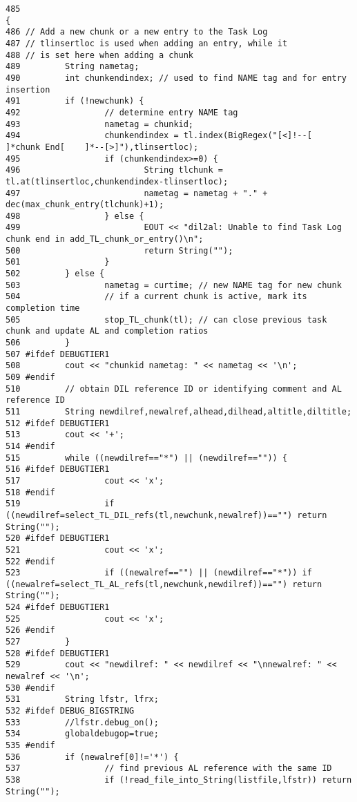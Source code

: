 \footnotesize\begin{verbatim}485                                                                                                                {
486 // Add a new chunk or a new entry to the Task Log
487 // tlinsertloc is used when adding an entry, while it
488 // is set here when adding a chunk
489         String nametag;
490         int chunkendindex; // used to find NAME tag and for entry insertion
491         if (!newchunk) {
492                 // determine entry NAME tag
493                 nametag = chunkid;
494                 chunkendindex = tl.index(BigRegex("[<]!--[      ]*chunk End[    ]*--[>]"),tlinsertloc);
495                 if (chunkendindex>=0) {
496                         String tlchunk = tl.at(tlinsertloc,chunkendindex-tlinsertloc);
497                         nametag = nametag + "." + dec(max_chunk_entry(tlchunk)+1);
498                 } else {
499                         EOUT << "dil2al: Unable to find Task Log chunk end in add_TL_chunk_or_entry()\n";
500                         return String("");
501                 }
502         } else {
503                 nametag = curtime; // new NAME tag for new chunk
504                 // if a current chunk is active, mark its completion time
505                 stop_TL_chunk(tl); // can close previous task chunk and update AL and completion ratios
506         }
507 #ifdef DEBUGTIER1
508         cout << "chunkid nametag: " << nametag << '\n';
509 #endif
510         // obtain DIL reference ID or identifying comment and AL reference ID
511         String newdilref,newalref,alhead,dilhead,altitle,diltitle;
512 #ifdef DEBUGTIER1
513         cout << '+';
514 #endif
515         while ((newdilref=="*") || (newdilref=="")) {
516 #ifdef DEBUGTIER1
517                 cout << 'x';
518 #endif
519                 if ((newdilref=select_TL_DIL_refs(tl,newchunk,newalref))=="") return String("");
520 #ifdef DEBUGTIER1
521                 cout << 'x';
522 #endif
523                 if ((newalref=="") || (newdilref=="*")) if ((newalref=select_TL_AL_refs(tl,newchunk,newdilref))=="") return String("");
524 #ifdef DEBUGTIER1
525                 cout << 'x';
526 #endif
527         }
528 #ifdef DEBUGTIER1
529         cout << "newdilref: " << newdilref << "\nnewalref: " << newalref << '\n';
530 #endif
531         String lfstr, lfrx;
532 #ifdef DEBUG_BIGSTRING
533         //lfstr.debug_on();
534         globaldebugop=true;
535 #endif
536         if (newalref[0]!='*') {
537                 // find previous AL reference with the same ID
538                 if (!read_file_into_String(listfile,lfstr)) return String("");

\end{verbatim}
